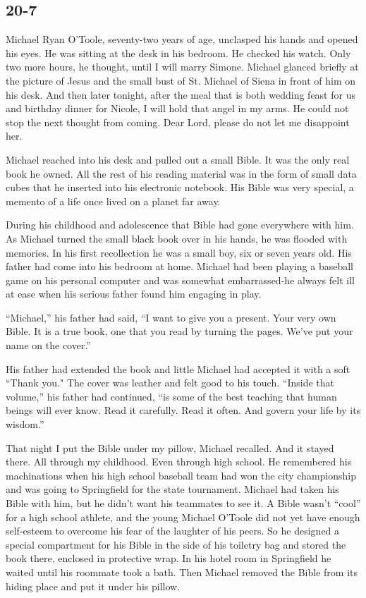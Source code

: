 \documentclass[]{article}
\begin{document}
{\subsection*{20-7}

Michael Ryan O’Toole, seventy-two years of age, unclasped his hands and opened his eyes.  He was sitting at the desk in his bedroom.  He checked his watch.  Only two more hours, he thought, until I will marry Simone.  Michael glanced briefly at the picture of Jesus and the small bust of St.  Michael of Siena in front of him on his desk.  And then later tonight, after the meal that is both wedding feast for us and birthday dinner for Nicole, I will hold that angel in my arms.  He could not stop the next thought from coming.  Dear Lord, please do not let me disappoint her.

Michael reached into his desk and pulled out a small Bible.  It was the only real book he owned.  All the rest of his reading material was in the form of small data cubes that he inserted into his electronic notebook.  His Bible was very special, a memento of a life once lived on a planet far away.

During his childhood and adolescence that Bible had gone everywhere with him.  As Michael turned the small black book over in his hands, he was flooded with memories.  In his first recollection he was a small boy, six or seven years old.  His father had come into his bedroom at home.  Michael had been playing a baseball game on his personal computer and was somewhat embarrassed-he always felt ill at ease when his serious father found him engaging in play.

“Michael,” his father had said, “I want to give you a present.  Your very own Bible.  It is a true book, one that you read by turning the pages.  We’ve put your name on the cover.”

His father had extended the book and little Michael had accepted it with a soft “Thank you."  The cover was leather and felt good to his touch.  “Inside that volume,” his father had continued, “is some of the best teaching that human beings will ever know.  Read it carefully.  Read it often.  And govern your life by its wisdom.”

That night I put the Bible under my pillow, Michael recalled.  And it stayed there.  All through my childhood.  Even through high school.  He remembered his machinations when his high school baseball team had won the city championship and was going to Springfield for the state tournament.  Michael had taken his Bible with him, but he didn’t want his teammates to see it.  A Bible wasn’t “cool” for a high school athlete, and the young Michael O’Toole did not yet have enough self-esteem to overcome his fear of the laughter of his peers.  So he designed a special compartment for his Bible in the side of his toiletry bag and stored the book there, enclosed in protective wrap.  In his hotel room in Springfield he waited until his roommate took a bath.  Then Michael removed the Bible from its hiding place and put it under his pillow.

}
\end{document}

